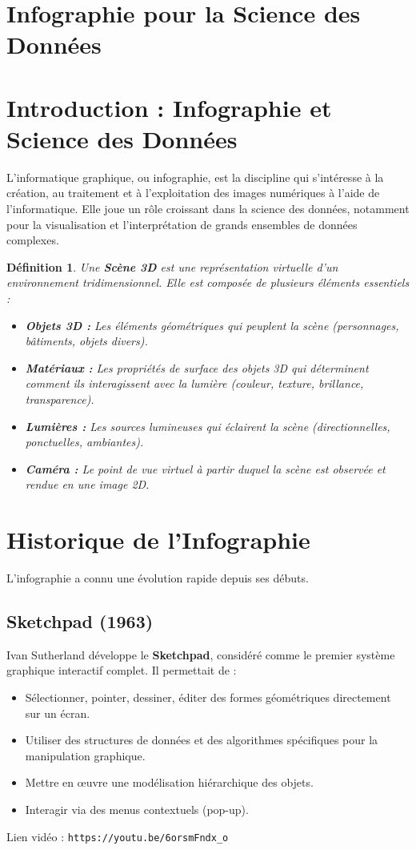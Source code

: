 \documentclass{article}
\newtheorem{definition}{Définition}
\begin{document}
\sloppy
\section*{Infographie pour la Science des Données}
\section{Introduction : Infographie et Science des Données}
L'informatique graphique, ou infographie, est la discipline qui s'intéresse à la création, au traitement et à l'exploitation des images numériques à l'aide de l'informatique. Elle joue un rôle croissant dans la science des données, notamment pour la visualisation et l'interprétation de grands ensembles de données complexes.
\begin{definition}
Une \textbf{Scène 3D} est une représentation virtuelle d'un environnement tridimensionnel. Elle est composée de plusieurs éléments essentiels :
\begin{itemize}
    \item \textbf{Objets 3D :} Les éléments géométriques qui peuplent la scène (personnages, bâtiments, objets divers).
    \item \textbf{Matériaux :} Les propriétés de surface des objets 3D qui déterminent comment ils interagissent avec la lumière (couleur, texture, brillance, transparence).
    \item \textbf{Lumières :} Les sources lumineuses qui éclairent la scène (directionnelles, ponctuelles, ambiantes).
    \item \textbf{Caméra :} Le point de vue virtuel à partir duquel la scène est observée et rendue en une image 2D.
\end{itemize}
\end{definition}
\section{Historique de l'Infographie}
L'infographie a connu une évolution rapide depuis ses débuts.
\subsection{Sketchpad (1963)}
Ivan Sutherland développe le \textbf{Sketchpad}, considéré comme le premier système graphique interactif complet. Il permettait de :
\begin{itemize}
    \item Sélectionner, pointer, dessiner, éditer des formes géométriques directement sur un écran.
    \item Utiliser des structures de données et des algorithmes spécifiques pour la manipulation graphique.
    \item Mettre en œuvre une modélisation hiérarchique des objets.
    \item Interagir via des menus contextuels (pop-up).
\end{itemize}
Lien vidéo : \texttt{https://youtu.be/6orsmFndx\_o}
\end{document}
